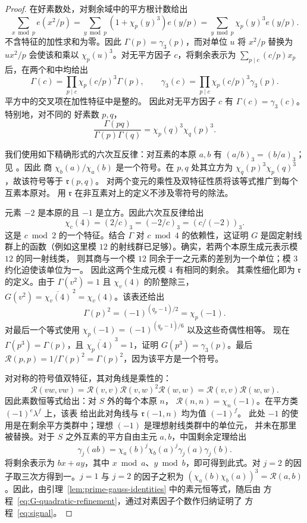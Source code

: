 \documentclass[11pt,a4paper]{article}
\numberwithin{equation}{section}
\numberwithin{figure}{section}
\theoremstyle{definition}
\theoremstyle{remark}
\begin{document}
\begin{proof}
在好素数处，对剩余域中的平方根计数给出
\[
 \sum_{x\bmod p}e(x^2/p)
 =\sum_{y\bmod p}(1+\chi_p(y)^3)e(y/p)
 =\sum_{y\bmod p}\chi_p(y)^3e(y/p).
\]
不含特征的加性求和为零。因此
$\Gamma(p)=\gamma_3(p)$，而对单位 $u$ 将 $x^2/p$ 替换为 $ux^2/p$
会使该和乘以 $\chi_p(u)^3$。对无平方因子 $c$，将剩余表示为
$\sum_{p\mid c}(c/p)x_p$ 后，在两个和中均给出
\[
 \Gamma(c)=\prod_{p\mid c}\chi_p(c/p)^3\Gamma(p),\qquad
 \gamma_3(c)=\prod_{p\mid c}\chi_p(c/p)^3\gamma_3(p).
\]
平方中的交叉项在加性特征中是整的。
因此对无平方因子 $c$ 有 $\Gamma(c)=\gamma_3(c)$。特别地，对不同的
好素数 $p,q$，
\[
 \frac{\Gamma(pq)}{\Gamma(p)\Gamma(q)}
 =\chi_p(q)^3\chi_q(p)^3.
\]

我们使用如下精确形式的六次互反律：对互素的本原
$a,b$ 有 $(a/b)_3=(b/a)_3$；见 \cite[Equation (1.4)]{DR}。因此
商 $\chi_b(a)/\chi_a(b)$ 是一个符号。在 $p,q$ 处其立方为
$\chi_q(p)^3\chi_p(q)^3$，故该符号等于 $\mathfrak r(p,q)$。
对两个变元的乘性及双特征性质将该等式推广到每个互素本原对。
用 $\mathfrak r$ 在非互素对上的定义不涉及零符号的除法。

元素 $-2$ 是本原的且 $-1$ 是立方。因此六次互反律给出
\[
 \chi_c(4)=(2/c)_3=(-2/c)_3=(c/(-2))_3.
\]
这是 $c\bmod2$ 的一个特征。结合 $\Gamma$
对 $c\bmod4$ 的依赖性，这证明 $G$ 是固定射线群上的函数（例如这里模
$12$ 的射线群已足够）。确实，若两个本原生成元表示模 $12$ 的同一射线类，
则其商与一个模 $12$ 同余于一之元素的差别为一个单位；模 $3$ 约化迫使该单位为一。
因此这两个生成元模 $4$ 有相同的剩余。
其乘性细化即为 $\mathfrak r$ 的定义。由于
$\Gamma(v^2)=1$ 且 $\chi_v(4)$ 的阶整除三，
$G(v^2)=\overline{\chi_v(4)}^{\,2}=\chi_v(4)$。该表还给出
\[
 \Gamma(p)^2=(-1)^{(q_p-1)/2}=\chi_p(-1).
\]
对最后一个等式使用
$\chi_p(-1)=(-1)^{(q_p-1)/6}$ 以及这些奇偶性相等。
现在 $\Gamma(p^3)=\Gamma(p)$，且
$\overline{\chi_p(4)}^{\,3}=1$，证明 $G(p^3)=\gamma_3(p)$。最后
$\mathcal R(p,p)=1/\Gamma(p)^2=\Gamma(p)^2$，因为该平方是一个符号。

对对称的符号值双特征，其对角线是乘性的：
\[
 \mathcal R(vw,vw)
 =\mathcal R(v,v)\mathcal R(v,w)^2\mathcal R(w,w)
 =\mathcal R(v,v)\mathcal R(w,w).
\]
因此素数恒等式给出：对 $S$ 外的每个本原 $n$，
$\mathcal R(n,n)=\chi_n(-1)$。在平方类 $(-1)^e\lambda^f$ 上，该表
给出此对角线与 $\mathfrak r(-1,n)$ 均为值 $(-1)^f$。
此处 $-1$ 的使用是在剩余平方类群中；理想 $(-1)$ 是理想射线类群中的单位元，
并未在那里被替换。对于 $S$ 之外互素的平方自由主元 $a,b$，中国剩余定理给出
\[
 \gamma_j(ab)=\chi_a(b)^j\chi_b(a)^j\gamma_j(a)\gamma_j(b).
\]
将剩余表示为 $bx+ay$，其中 $x\bmod a$、$y\bmod b$，即可得到此式。对 $j=2$ 的因子取三次方得到一。$j=1$ 与 $j=2$ 的因子之积为
$(\chi_a(b)\chi_b(a))^3=\mathcal R(a,b)$。因此，由引理~\ref{lem:prime-gauss-identities} 中的素元恒等式，随后由
方程~\eqref{eq:G-quadratic-refinement}，通过对素因子个数作归纳证明了
方程~\eqref{eq:signal}。
\end{proof}
\end{document}
